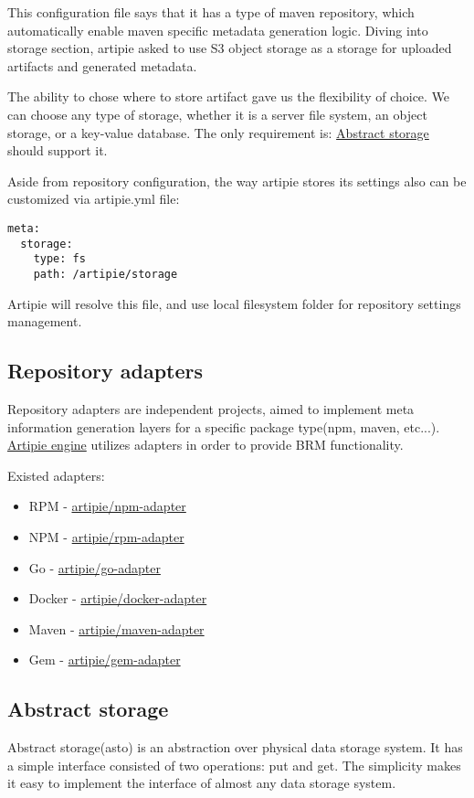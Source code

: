 \documentclass[12pt,oneside]{article}
\begin{document}
This configuration file says that it has a type of maven repository,
which automatically enable maven specific metadata generation logic.
Diving into storage section, artipie asked to use S3 object storage 
as a storage for uploaded artifacts and generated metadata.

The ability to chose where to store artifact gave us the flexibility of choice.
We can choose any type of storage, whether it is a server file system,
an object storage, or a key-value database.
The only requirement is: \hyperref[sec:asto]{Abstract storage} should support it.

Aside from repository configuration, the way artipie stores its settings
also can be customized via artipie.yml file:
\begin{Verbatim}[tabsize=2]
meta:
  storage:
    type: fs
    path: /artipie/storage
\end{Verbatim}
Artipie will resolve this file, and use local filesystem folder for repository settings management. 

\subsection{Repository adapters}
Repository adapters are independent projects, 
aimed to implement meta information generation
layers for a specific package type(npm, maven, etc...).
\hyperref[sec:arti-engine]{Artipie engine} utilizes adapters in order to provide BRM functionality.

Existed adapters:
\begin{itemize}
	\item RPM - \href{https://github.com/artipie/npm-adapter}{artipie/npm-adapter}
	\item NPM - \href{https://github.com/artipie/rpm-adapter}{artipie/rpm-adapter}
	\item Go - \href{https://github.com/artipie/go-adapter}{artipie/go-adapter}
	\item Docker - \href{https://github.com/artipie/go-adapter}{artipie/docker-adapter}
	\item Maven - \href{https://github.com/artipie/go-adapter}{artipie/maven-adapter}
	\item Gem - \href{https://github.com/artipie/go-adapter}{artipie/gem-adapter}
\end{itemize}

\subsection{Abstract storage}
\label{sec:asto}
Abstract storage(asto) is an abstraction over physical data storage system.
It has a simple interface consisted of two operations: put and get.
The simplicity makes it easy to implement the interface of almost any data storage system.
\end{document}
